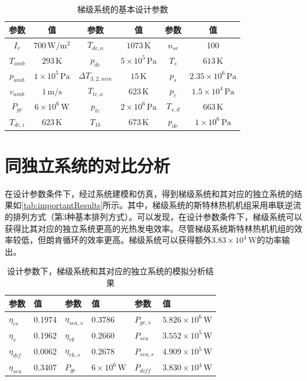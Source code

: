\begin{table}[htbp]
	\caption{梯级系统的基本设计参数}
	\centering
	\begin{tabular}{cccccc}
		\toprule
		参数		&	值	&	参数		&	值	&	参数		&	值\\
		\midrule
		$I_r$		&	$700\,\mathrm{W/m^2}$	&	$T_{dc,o}$	&	$1073\,\mathrm{K}$	&	$n_{se}$	&	100\\
		$T_{amb}$	&	$293\,\mathrm{K}$	&	$p_{dc}$		&	$5\times10^5\,\mathrm{Pa}$	&	$T_s$	&	$613\,\mathrm{K}$\\
		$p_{amb}$	&	$1\times10^5\,\mathrm{Pa}$	&	$\Delta{}T_{3,2,min}$	&	$15\,\mathrm{K}$	&	$p_s$	&	$2.35\times10^6\,\mathrm{Pa}$\\
		$v_{amb}$	&	$1\,\mathrm{m/s}$	&	$T_{tc,o}$	&	$623\,\mathrm{K}$	&	$p_c$	&	$1.5\times10^4\,\mathrm{Pa}$\\
		$P_{ge}$	&	$6\times10^6\,\mathrm{W}$	&	
$p_{tc}$	&	$2\times10^6\,\mathrm{Pa}$	&	$T_{s,d}$	&	$663\,\mathrm{K}$\\
		$T_{dc,i}$		&	$623\,\mathrm{K}$	&	$T_{1b}$	&	$673\,\mathrm{K}$	&	$p_{de}$ 	& 	$1\times10^6\,\mathrm{Pa}$\\
	\bottomrule
	\end{tabular}
	\label{tab:CascadeSystemParameters}
\end{table}

\section{同独立系统的对比分析}

在设计参数条件下，经过系统建模和仿真，得到梯级系统和其对应的独立系统的结果如\autoref{tab:importantResults}所示。其中，梯级系统的斯特林热机机组采用串联逆流的排列方式（第3种基本排列方式）。可以发现，在设计参数条件下，梯级系统可以获得比其对应的独立系统更高的光热发电效率。尽管梯级系统斯特林热机机组的效率较低，但朗肯循环的效率更高。梯级系统可以获得额外$3.83\times10^4\,\mathrm{W}$的功率输出。

\begin{table}[htbp]
	\caption{设计参数下，梯级系统和其对应的独立系统的模拟分析结果}
	\centering
	\begin{tabular}{p{1cm}<{\centering} p{1.75cm}<{\centering} p{1cm}<{\centering} p{1.75cm}<{\centering} p{1cm}<{\centering} p{3cm}<{\centering}}
		\toprule
		参数		&	值	&	参数		&	值	&	参数		&	值\\
		\midrule
		$\eta_{cs}$		&	0.1974	&	$\eta_{sea,s}$	&	0.3786	&	$P_{ge,s}$	&	$5.826\times10^6\,\mathrm{W}$\\
		$\eta_{s}$	&	0.1962	&	$\eta_{rk}$	&	0.2660	&	$P_{sea}$		&	$3.552\times10^5\,\mathrm{W}$\\
		$\eta_{dif}$		&	0.0062	&	$\eta_{rk,s}$	&	0.2678	&	$P_{sea,s}$	&	$4.909\times10^5\,\mathrm{W}$\\
		$\eta_{sea}$	&	0.3407	&	$P_{ge}$		&	$6\times10^6\,\mathrm{W}$	&	$P_{diff}$		&	$3.830\times10^4\,\mathrm{W}$\\
		\bottomrule
	\end{tabular}
	\label{tab:importantResults}
\end{table}

